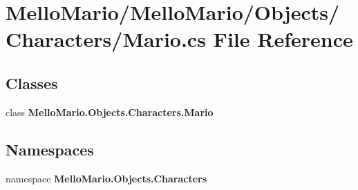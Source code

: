 \section{Mello\+Mario/\+Mello\+Mario/\+Objects/\+Characters/\+Mario.cs File Reference}
\label{Mario_8cs}
\subsection*{Classes}
\begin{DoxyCompactItemize}
\item 
class \textbf{ Mello\+Mario.\+Objects.\+Characters.\+Mario}
\end{DoxyCompactItemize}
\subsection*{Namespaces}
\begin{DoxyCompactItemize}
\item 
namespace \textbf{ Mello\+Mario.\+Objects.\+Characters}
\end{DoxyCompactItemize}
